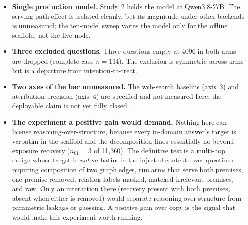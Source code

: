 \documentclass[10pt,twocolumn]{article}
\begin{document}
\begin{itemize}[topsep=2pt,itemsep=2pt,leftmargin=1.4em]
reported run: its document-embedding recall (0.816) is below the 0.87 design floor (a red gate we
report rather than relax), so the loom arm is lexical-retrieval only. A query-shaped embedding that
clears the floor could change the engagement and thin-set numbers.
\item \textbf{Single production model.} Study~2 holds the model at Qwen3.8-27B. The serving-path effect
is isolated cleanly, but its magnitude under other backends is unmeasured; the ten-model sweep varies
the model only for the offline scaffold, not the live node.
\item \textbf{Three excluded questions.} Three questions empty at 4096 in both arms are dropped
(complete-case $n=114$). The exclusion is symmetric across arms but is a departure from intention-to-treat.
\item \textbf{Two axes of the bar unmeasured.} The web-search baseline (axis~3) and attribution
precision (axis~4) are specified and not measured here; the deployable claim is not yet fully closed.
\item \textbf{The experiment a positive gain would demand.} Nothing here can license
reasoning-over-structure, because every in-domain answer's target is verbatim in the scaffold and the
decomposition finds essentially no beyond-exposure recovery ($n_{01}=3$ of 11{,}360). The definitive
test is a multi-hop design whose target is \emph{not} verbatim in the injected context: over questions
requiring composition of two graph edges, run arms that serve both premises, one premise removed,
relation labels masked, matched irrelevant premises, and raw. Only an interaction there (recovery
present with both premises, absent when either is removed) would separate reasoning over structure from
parametric leakage or guessing. A positive gain over copy is the signal that would make this experiment
worth running.
\end{itemize}
\end{document}
